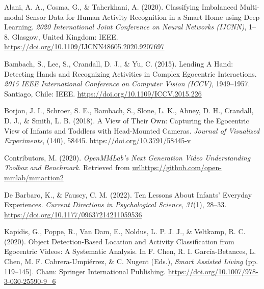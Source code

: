 \documentclass[
  man,floatsintext]{apa6}
\newlength{\cslhangindent}
\newenvironment{CSLReferences}[2] %
 {\begin{list}{}{%
  \setlength{\itemindent}{0pt}
  \setlength{\leftmargin}{0pt}
  \setlength{\parsep}{0pt}
  \ifodd #1
   \setlength{\leftmargin}{\cslhangindent}
   \setlength{\itemindent}{-1\cslhangindent}
  \fi
  \setlength{\itemsep}{#2\baselineskip}}}
 {\end{list}}
\begin{document}
\begingroup
\setlength{\parindent}{-0.5in}
\setlength{\leftskip}{0.5in}

\label{refs}
\begin{CSLReferences}{1}{0}
Alani, A. A., Cosma, G., \& Taherkhani, A. (2020). Classifying {Imbalanced Multi-modal Sensor Data} for {Human Activity Recognition} in a {Smart Home} using {Deep Learning}. \emph{2020 {International Joint Conference} on {Neural Networks} ({IJCNN})}, 1--8. Glasgow, United Kingdom: IEEE. \url{https://doi.org/10.1109/IJCNN48605.2020.9207697}

Bambach, S., Lee, S., Crandall, D. J., \& Yu, C. (2015). Lending {A Hand}: {Detecting Hands} and {Recognizing Activities} in {Complex Egocentric Interactions}. \emph{2015 {IEEE International Conference} on {Computer Vision} ({ICCV})}, 1949--1957. Santiago, Chile: IEEE. \url{https://doi.org/10.1109/ICCV.2015.226}

Borjon, J. I., Schroer, S. E., Bambach, S., Slone, L. K., Abney, D. H., Crandall, D. J., \& Smith, L. B. (2018). A {View} of {Their Own}: {Capturing} the {Egocentric View} of {Infants} and {Toddlers} with {Head-Mounted Cameras}. \emph{Journal of Visualized Experiments}, (140), 58445. \url{https://doi.org/10.3791/58445-v}

Contributors, M. (2020). \emph{{OpenMMLab}'s {Next Generation Video Understanding Toolbox} and {Benchmark}}. Retrieved from \url{urlhttps://github.com/open-mmlab/mmaction2}

De Barbaro, K., \& Fausey, C. M. (2022). Ten {Lessons About Infants}' {Everyday Experiences}. \emph{Current Directions in Psychological Science}, \emph{31}(1), 28--33. \url{https://doi.org/10.1177/09637214211059536}

Kapidis, G., Poppe, R., Van Dam, E., Noldus, L. P. J. J., \& Veltkamp, R. C. (2020). Object {Detection-Based Location} and {Activity Classification} from {Egocentric Videos}: {A Systematic Analysis}. In F. Chen, R. I. García-Betances, L. Chen, M. F. Cabrera-Umpiérrez, \& C. Nugent (Eds.), \emph{Smart {Assisted Living}} (pp. 119--145). Cham: Springer International Publishing. \url{https://doi.org/10.1007/978-3-030-25590-9_6}


\end{CSLReferences}
\end{document}
